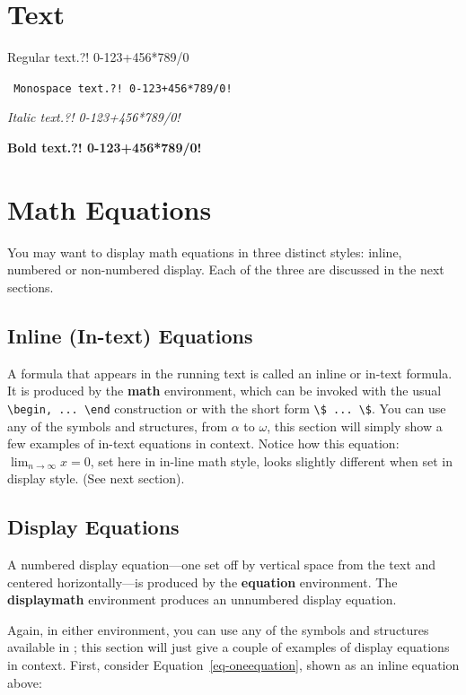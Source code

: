 \section{Text}

Regular text.?! 0-123+456*789/0

\texttt{ Monospace text.?! 0-123+456*789/0!}

\textit{ Italic text.?! 0-123+456*789/0!}

\textbf{ Bold text.?! 0-123+456*789/0!}

\section{Math Equations}\label{math-equations}

You may want to display math equations in three distinct styles: inline,
numbered or non-numbered display. Each of the three are discussed in the next
sections.

\subsection{Inline (In-text) Equations}\label{inline-in-text-equations}

A formula that appears in the running text is called an inline or in-text
formula. It is produced by the \textbf{math} environment, which can be invoked
with the usual \texttt{\textbackslash{}begin,\ ...\ \textbackslash{}end}
construction or with the short form \texttt{\textbackslash{}\$\ ...\
\textbackslash{}\$}. You can use any of the symbols and structures, from
\(\alpha\) to \(\omega\), this section will simply show a few examples of
in-text equations in context. Notice how this equation: \(\lim_{n\rightarrow
\infty}x=0\), set here in in-line math style, looks slightly different when set
in display style. (See next section).

\subsection{Display Equations}\label{display-equations}

A numbered display equation---one set off by vertical space from the text and
centered horizontally---is produced by the \textbf{equation} environment. The
\textbf{displaymath} environment produces an unnumbered display equation.

Again, in either environment, you can use any of the symbols and structures
available in \LaTeX@; this section will just give a couple of examples of
display equations in context. First, consider Equation~\ref{eq-oneequation},
shown as an inline equation above:

